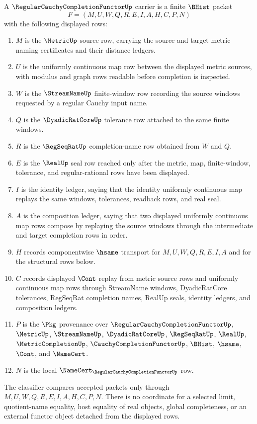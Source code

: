 \begin{definition}
\label{def:regular-cauchy-completion-functor-carrier}
A $\RegularCauchyCompletionFunctorUp$ carrier is a finite $\BHist$ packet
$$
F=(M,U,W,Q,R,E,I,A,H,C,P,N)
$$
with the following displayed rows:
\begin{enumerate}
\item $M$ is the $\MetricUp$ source row, carrying the source and target metric naming certificates and their distance ledgers.
\item $U$ is the uniformly continuous map row between the displayed metric sources, with modulus and graph rows readable before completion is inspected.
\item $W$ is the $\StreamNameUp$ finite-window row recording the source windows requested by a regular Cauchy input name.
\item $Q$ is the $\DyadicRatCoreUp$ tolerance row attached to the same finite windows.
\item $R$ is the $\RegSeqRatUp$ completion-name row obtained from $W$ and $Q$.
\item $E$ is the $\RealUp$ seal row reached only after the metric, map, finite-window, tolerance, and regular-rational rows have been displayed.
\item $I$ is the identity ledger, saying that the identity uniformly continuous map replays the same windows, tolerances, readback rows, and real seal.
\item $A$ is the composition ledger, saying that two displayed uniformly continuous map rows compose by replaying the source windows through the intermediate and target completion rows in order.
\item $H$ records componentwise $\hsame$ transport for $M,U,W,Q,R,E,I,A$ and for the structural rows below.
\item $C$ records displayed $\Cont$ replay from metric source rows and uniformly continuous map rows through StreamName windows, DyadicRatCore tolerances, RegSeqRat completion names, RealUp seals, identity ledgers, and composition ledgers.
\item $P$ is the $\Pkg$ provenance over $\RegularCauchyCompletionFunctorUp$, $\MetricUp$, $\StreamNameUp$, $\DyadicRatCoreUp$, $\RegSeqRatUp$, $\RealUp$, $\MetricCompletionUp$, $\CauchyCompletionFunctorUp$, $\BHist$, $\hsame$, $\Cont$, and $\NameCert$.
\item $N$ is the local $\NameCert_{\RegularCauchyCompletionFunctorUp}$ row.
\end{enumerate}
The classifier compares accepted packets only through $M,U,W,Q,R,E,I,A,H,C,P,N$. There is no coordinate for a selected limit, quotient-name equality, host equality of real objects, global completeness, or an external functor object detached from the displayed rows.
\end{definition}


